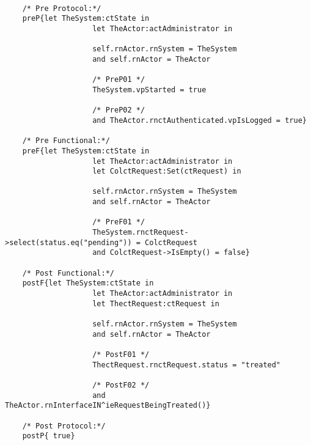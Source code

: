 	\scriptsize
	\vspace{0.5cm}
	\begin{lstlisting}[style=MessirStyle,firstnumber=auto,captionpos=b,caption={\msrmessir (MCL-oriented) specification of the operation \emph{oeTreatRequest}.},label=OM-actAdministrator-oeTreatRequest-MCL-LST]

	/* Pre Protocol:*/ 
	preP{let TheSystem:ctState in
					let TheActor:actAdministrator in
					
					self.rnActor.rnSystem = TheSystem
					and self.rnActor = TheActor
					
					/* PreP01 */
					TheSystem.vpStarted = true
					
					/* PreP02 */
					and TheActor.rnctAuthenticated.vpIsLogged = true}
	
	/* Pre Functional:*/
	preF{let TheSystem:ctState in
					let TheActor:actAdministrator in
					let ColctRequest:Set(ctRequest) in
					
					self.rnActor.rnSystem = TheSystem
					and self.rnActor = TheActor
					
					/* PreF01 */
					TheSystem.rnctRequest->select(status.eq("pending")) = ColctRequest
					and ColctRequest->IsEmpty() = false}
	
	/* Post Functional:*/ 
	postF{let TheSystem:ctState in
					let TheActor:actAdministrator in
					let ThectRequest:ctRequest in
					
					self.rnActor.rnSystem = TheSystem
					and self.rnActor = TheActor
					
					/* PostF01 */
					ThectRequest.rnctRequest.status = "treated"
					
					/* PostF02 */
					and TheActor.rnInterfaceIN^ieRequestBeingTreated()}
	
	/* Post Protocol:*/ 
	postP{ true}
	
	\end{lstlisting}
	\normalsize 
	
	
	
	





